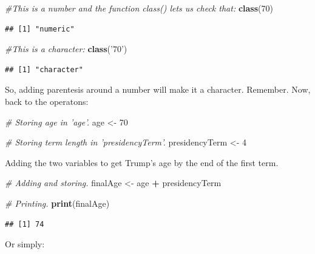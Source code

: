 \documentclass[]{book}
\newenvironment{Shaded}{\begin{snugshade}}{\end{snugshade}}
\newcommand{\CommentTok}[1]{\textcolor[rgb]{0.56,0.35,0.01}{\textit{#1}}}
\newcommand{\DecValTok}[1]{\textcolor[rgb]{0.00,0.00,0.81}{#1}}
\newcommand{\KeywordTok}[1]{\textcolor[rgb]{0.13,0.29,0.53}{\textbf{#1}}}
\newcommand{\NormalTok}[1]{#1}
\newcommand{\OperatorTok}[1]{\textcolor[rgb]{0.81,0.36,0.00}{\textbf{#1}}}
\newcommand{\StringTok}[1]{\textcolor[rgb]{0.31,0.60,0.02}{#1}}
\begin{document}
\begin{Shaded}
\begin{Highlighting}[]
\CommentTok{#This is a number and the function class() lets us check that:}
\KeywordTok{class}\NormalTok{(}\DecValTok{70}\NormalTok{)}
\end{Highlighting}
\end{Shaded}

\begin{verbatim}
## [1] "numeric"
\end{verbatim}

\begin{Shaded}
\begin{Highlighting}[]
\CommentTok{#This is a character:}
\KeywordTok{class}\NormalTok{(}\StringTok{'70'}\NormalTok{)}
\end{Highlighting}
\end{Shaded}

\begin{verbatim}
## [1] "character"
\end{verbatim}

So, adding parentesis around a number will make it a character. Remember. Now, back to the operatons:

\begin{Shaded}
\begin{Highlighting}[]
\CommentTok{# Storing age in 'age'.}
\NormalTok{age <-}\StringTok{ }\DecValTok{70}

\CommentTok{# Storing term length in 'presidencyTerm'.}
\NormalTok{presidencyTerm <-}\StringTok{ }\DecValTok{4}
\end{Highlighting}
\end{Shaded}

Adding the two variables to get Trump's age by the end of the first term.

\begin{Shaded}
\begin{Highlighting}[]
\CommentTok{# Adding and storing.}
\NormalTok{finalAge <-}\StringTok{ }\NormalTok{age }\OperatorTok{+}\StringTok{ }\NormalTok{presidencyTerm}

\CommentTok{# Printing.}
\KeywordTok{print}\NormalTok{(finalAge)}
\end{Highlighting}
\end{Shaded}

\begin{verbatim}
## [1] 74
\end{verbatim}

Or simply:
\end{document}
